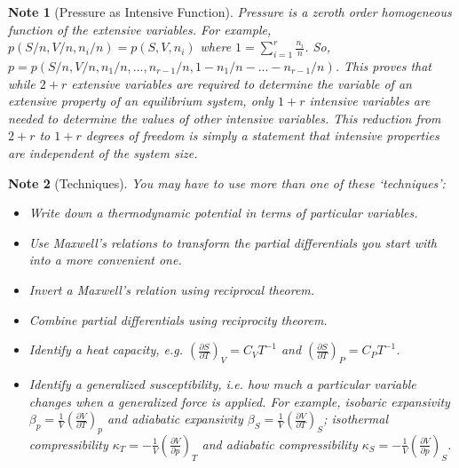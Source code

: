 \documentclass[a4paper]{article}
\theoremstyle{new}
\newtheorem{Note}{Note}[section]
\begin{document}
\begin{Note}[Pressure as Intensive Function]
Pressure is a zeroth order homogeneous function of the extensive variables. For example, $p(S/n,V/n,n_i/n)=p(S,V,n_i)$ where $1=\sum_{i=1}^r\frac{n_i}{n}$. So, $p=p(S/n,V/n,n_1/n,...,n_{r-1}/n,1-n_1/n-...-n_{r-1}/n)$. This proves that while $2+r$ extensive variables are required to determine the variable of an extensive property of an equilibrium system, only $1+r$ intensive variables are needed to determine the values of other intensive variables. This reduction from $2+r$ to $1+r$ degrees of freedom is simply a statement that intensive properties are independent of the system size.
\end{Note}
\begin{Note}[Techniques]
You may have to use more than one of these `techniques':
\begin{itemize}
    \item Write down a thermodynamic potential in terms of particular variables.
    \item Use Maxwell's relations to transform the partial differentials you start with into a more convenient one.
    \item Invert a Maxwell's relation using reciprocal theorem.
    \item Combine partial differentials using reciprocity theorem.
    \item Identify a heat capacity, e.g. $(\frac{\partial S}{\partial T})_V=C_VT^{-1}$ and $(\frac{\partial S}{\partial T})_P=C_PT^{-1}$.
    \item Identify a generalized susceptibility, i.e. how much a particular variable changes when a generalized force is applied. For example, isobaric expansivity $\beta_p=\frac{1}{V}(\frac{\partial V}{\partial T})_p$ and adiabatic expansivity $\beta_S=\frac{1}{V}(\frac{\partial V}{\partial T})_S$; isothermal compressibility $\kappa_T=-\frac{1}{V}(\frac{\partial V}{\partial p})_T$ and adiabatic compressibility $\kappa_S=-\frac{1}{V}(\frac{\partial V}{\partial p})_S$.
\end{itemize}
\end{Note}
\end{document}
